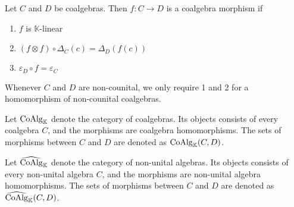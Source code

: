 \documentclass[../thesis.tex]{subfiles}
\begin{document}




                    


            \begin{definition}
                Let $C$ and $D$ be coalgebras. Then $f:C\rightarrow D$ is a coalgebra morphism if
                \begin{enumerate}
                    \item $f$ is $\mathbb{K}$-linear
                    \item $(f\otimes f)\circ\Delta_C(c) = \Delta_D(f(c))$
                    \item $\varepsilon_D \circ f = \varepsilon_C$
                \end{enumerate}
                Whenever $C$ and $D$ are non-counital, we only require 1 and 2 for a homomorphism of non-counital coalgebras.
            \end{definition}

            \begin{definition}
                Let $\tt{CoAlg}_{\mathbb{K}}$ denote the category of coalgebras. Its objects consists of every coalgebra $C$, and the morphisms are coalgebra homomorphisms. The sets of morphisms between $C$ and $D$ are denoted as $\tt{CoAlg}_{\mathbb{K}}(C,D)$.
                
                Let $\widehat{\tt{CoAlg}}_{\mathbb{K}}$ denote the category of non-unital algebras. Its objects consists of every non-unital algebra $C$, and the morphisms are non-unital algebra homomorphisms. The sets of morphisms between $C$ and $D$ are denoted as $\widehat{\tt{CoAlg}}_{\mathbb{K}}(C,D)$.
            \end{definition}
\end{document}
